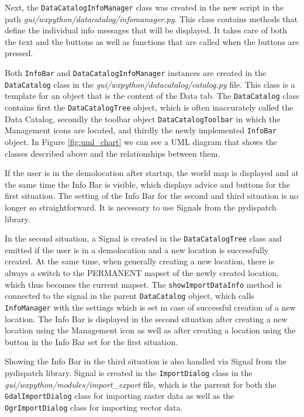 \documentclass[a4paper,10pt,twoside]{article}
\begin{document}
Next, the \texttt{DataCatalogInfoManager} class was created in the new
script in the path
\textit{gui/wxpython/datacatalog/infomanager.py}. This class contains
methods that define the individual info messages that will be
displayed. It takes care of both the text and the buttons as well as
functions that are called when the buttons are pressed.

Both \texttt{InfoBar} and \texttt{DataCatalogInfoManager} instances
are created in the \texttt{DataCatalog} class in the
\textit{gui/wxpython/datacatalog/catalog.py} file. This class is a
template for an object that is the content of the Data tab. The
\texttt{DataCatalog} class contains first the \texttt{DataCatalogTree}
object, which is often inaccurately called the Data Catalog, secondly
the toolbar object \texttt{DataCatalogToolbar} in which the Management
icons are located, and thirdly the newly implemented \texttt{InfoBar}
object. In Figure \ref{fig:uml_chart} we can see a UML diagram that
shows the classes described above and the relationships between them.

If the user is in the demolocation after startup, the world map is
displayed and at the same time the Info Bar is visible, which displays
advice and buttons for the first situation. The setting of the Info
Bar for the second and third situation is no longer so
straightforward. It is necessary to use Signals from the pydispatch
library.

In the second situation, a Signal is created in the
\texttt{DataCatalogTree} class and emitted if the user is in a
demolocation and a new location is successfully created. At the same
time, when generally creating a new location, there is always a switch
to the PERMANENT mapset of the newly created location, which thus
becomes the current mapset. The \texttt{showImportDataInfo} method is
connected to the signal in the parent \texttt{DataCatalog} object,
which calls \texttt{InfoManager} with the settings which is set in
case of successful creation of a new location. The Info Bar is
displayed in the second situation after creating a new location using
the Management icon as well as after creating a location using the
button in the Info Bar set for the first situation.

Showing the Info Bar in the third situation is also handled via Signal
from the pydispatch library. Signal is created in the
\texttt{ImportDialog} class in the
\textit{gui/wxpython/modules/import\_export} file, which is the
parrent for both the \texttt{GdalImportDialog} class for importing
raster data as well as the \texttt{OgrImportDialog} class for
importing vector data.
\end{document}
